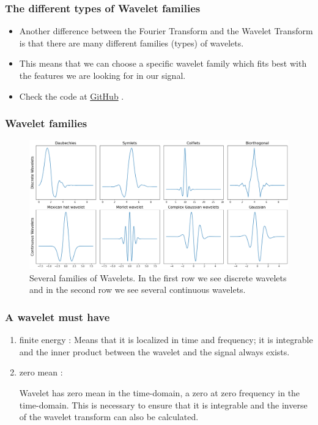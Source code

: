 \documentclass{beamer}
\newcommand{\github}{
\href{https://github.com/A-M-Kharazi/Machine-Learning-TMU}{GitHub}
}
\begin{document}
\begin{frame}
	\frametitle{The different types of Wavelet families}
	
	\begin{itemize}
		\item
			Another difference between the Fourier Transform and the Wavelet Transform is that there are many different families (types) of wavelets.
		
		\item
		
		This means that we can choose a specific wavelet family which fits best with the features we are looking for in our signal.
		
		\item Check the code at \github.
	\end{itemize}
	

\end{frame}


\begin{frame}
	\frametitle{Wavelet families}
	\begin{center}
			\begin{figure}\label{fig7}
			\includegraphics[scale=0.25]{wavelet_families.png}
			\caption{ Several families of Wavelets. In the first row we see discrete wavelets and in the second row we see several continuous wavelets.}
		\end{figure}
	\end{center}
	
\end{frame}


\begin{frame}
	\frametitle{A wavelet must have}
	
	\begin{enumerate}
		\item
		 finite energy : Means that it is localized in time and frequency; it is integrable and the inner product between the wavelet and the signal always exists.
		\item
		zero mean : 
		
		Wavelet has zero mean in the time-domain, a zero at zero frequency in the time-domain. This is necessary to ensure that it is integrable and the inverse of the wavelet transform can also be calculated.
		
	\end{enumerate}
	
\end{frame}
\end{document}
